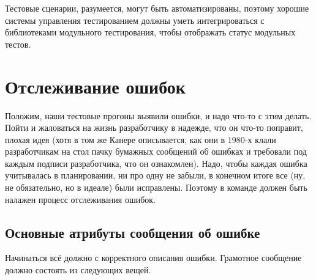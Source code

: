 \documentclass{../../text-style}
\begin{document}
Тестовые сценарии, разумеется, могут быть автоматизированы, поэтому хорошие системы управления тестированием должны уметь интегрироваться с библиотеками модульного тестирования, чтобы отображать статус модульных тестов.

\section{Отслеживание ошибок}

Положим, наши тестовые прогоны выявили ошибки, и надо что-то с этим делать. Пойти и жаловаться на жизнь разработчику в надежде, что он что-то поправит, плохая идея (хотя в том же Канере описывается, как они в 1980-х клали разработчикам на стол пачку бумажных сообщений об ошибках и требовали под каждым подписи разработчика, что он ознакомлен). Надо, чтобы каждая ошибка учитывалась в планировании, ни про одну не забыли, в конечном итоге все (ну, не обязательно, но в идеале) были исправлены. Поэтому в команде должен быть налажен процесс отслеживания ошибок.

\subsection{Основные атрибуты сообщения об ошибке}

Начинаться всё должно с корректного описания ошибки. Грамотное сообщение должно состоять из следующих вещей.
\end{document}
